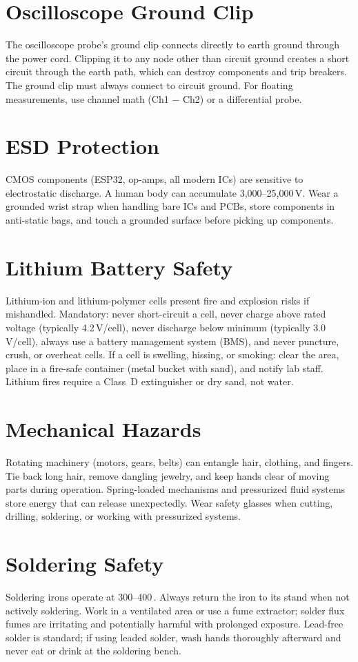 \section*{Oscilloscope Ground Clip}
The oscilloscope probe's ground clip connects directly to earth ground through the power cord. Clipping it to any node other than circuit ground creates a short circuit through the earth path, which can destroy components and trip breakers. The ground clip must always connect to circuit ground. For floating measurements, use channel math (Ch1 $-$ Ch2) or a differential probe.

\section*{ESD Protection}
CMOS components (ESP32, op-amps, all modern ICs) are sensitive to electrostatic discharge. A human body can accumulate 3,000--25,000\,V. Wear a grounded wrist strap when handling bare ICs and PCBs, store components in anti-static bags, and touch a grounded surface before picking up components.

\section*{Lithium Battery Safety}
Lithium-ion and lithium-polymer cells present fire and explosion risks if mishandled. Mandatory: never short-circuit a cell, never charge above rated voltage (typically 4.2\,V/cell), never discharge below minimum (typically 3.0\,V/cell), always use a battery management system (BMS), and never puncture, crush, or overheat cells. If a cell is swelling, hissing, or smoking: clear the area, place in a fire-safe container (metal bucket with sand), and notify lab staff. Lithium fires require a Class~D extinguisher or dry sand, not water.

\section*{Mechanical Hazards}
Rotating machinery (motors, gears, belts) can entangle hair, clothing, and fingers. Tie back long hair, remove dangling jewelry, and keep hands clear of moving parts during operation. Spring-loaded mechanisms and pressurized fluid systems store energy that can release unexpectedly. Wear safety glasses when cutting, drilling, soldering, or working with pressurized systems.

\section*{Soldering Safety}
Soldering irons operate at 300--400\,\degC{}. Always return the iron to its stand when not actively soldering. Work in a ventilated area or use a fume extractor; solder flux fumes are irritating and potentially harmful with prolonged exposure. Lead-free solder is standard; if using leaded solder, wash hands thoroughly afterward and never eat or drink at the soldering bench.

